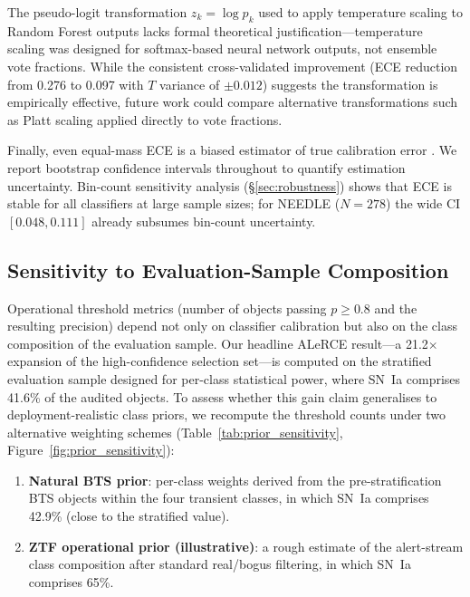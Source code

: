 \documentclass[twocolumn]{aastex631}
\begin{document}
The pseudo-logit transformation $z_k = \log p_k$ used to apply temperature scaling to Random Forest outputs lacks formal theoretical justification---temperature scaling was designed for softmax-based neural network outputs, not ensemble vote fractions. While the consistent cross-validated improvement (ECE reduction from 0.276 to 0.097 with $T$ variance of $\pm 0.012$) suggests the transformation is empirically effective, future work could compare alternative transformations such as Platt scaling applied directly to vote fractions.

Finally, even equal-mass ECE is a biased estimator of true calibration error \citep{roelofs2022}. We report bootstrap confidence intervals throughout to quantify estimation uncertainty. Bin-count sensitivity analysis (\S\ref{sec:robustness}) shows that ECE is stable for all classifiers at large sample sizes; for NEEDLE ($N = 278$) the wide CI $[0.048, 0.111]$ already subsumes bin-count uncertainty.


\subsection{Sensitivity to Evaluation-Sample Composition}
\label{sec:prior_sensitivity}

Operational threshold metrics (number of objects passing $p \geq 0.8$
and the resulting precision) depend not only on classifier calibration
but also on the class composition of the evaluation sample. Our headline
ALeRCE result---a 21.2$\times$ expansion of the high-confidence
selection set---is computed on the stratified evaluation sample
designed for per-class statistical power, where SN~Ia comprises
41.6\% of the audited objects. To assess whether this gain claim
generalises to deployment-realistic class priors, we recompute the
threshold counts under two alternative weighting schemes
(Table~\ref{tab:prior_sensitivity}, Figure~\ref{fig:prior_sensitivity}):

\begin{enumerate}
\item \textbf{Natural BTS prior}: per-class weights derived from the
pre-stratification BTS objects within the four transient classes,
in which SN~Ia comprises 42.9\% (close to the stratified value).
\item \textbf{ZTF operational prior (illustrative)}: a rough estimate
of the alert-stream class composition after standard real/bogus
filtering, in which SN~Ia comprises 65\%.
\end{enumerate}
\end{document}
